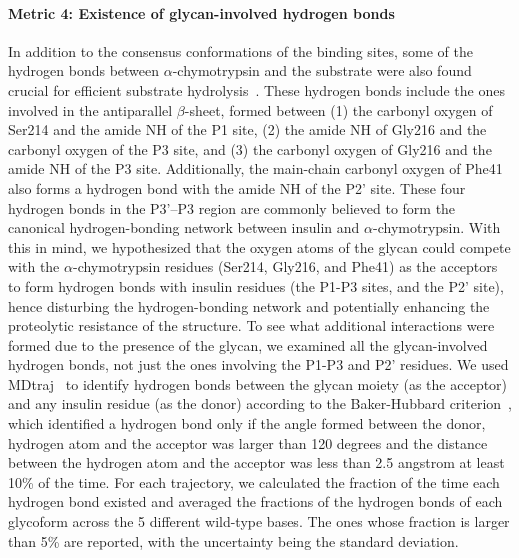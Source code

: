 \documentclass[9pt]{elife}
\begin{document}
\paragraph{Metric 4: Existence of glycan-involved hydrogen bonds}
In addition to the consensus conformations of the binding sites, some of the hydrogen bonds between $\alpha$-chymotrypsin and the substrate were also found crucial for efficient substrate hydrolysis~\cite{hedstrom2002serine}. These hydrogen bonds include the ones involved in the antiparallel $\beta$-sheet, formed between (1) the carbonyl oxygen of Ser214 and the amide NH of the P1 site, (2) the amide NH of Gly216 and the carbonyl oxygen of the P3 site, and (3) the carbonyl oxygen of Gly216 and the amide  NH of the P3 site. Additionally, the main-chain carbonyl oxygen of Phe41 also forms a hydrogen bond with the amide NH of the P2' site. These four hydrogen bonds in the P3'--P3 region are commonly believed to form the canonical hydrogen-bonding network between insulin and $\alpha$-chymotrypsin. With this in mind, we hypothesized that the oxygen atoms of the glycan could compete with the $\alpha$-chymotrypsin residues (Ser214, Gly216, and Phe41) as the acceptors to form hydrogen bonds with insulin residues (the P1-P3 sites, and the P2' site), hence disturbing the hydrogen-bonding network and potentially enhancing the proteolytic resistance of the structure. To see what additional interactions were formed due to the presence of the glycan, we examined all the glycan-involved hydrogen bonds, not just the ones involving the P1-P3 and P2' residues. We used MDtraj~\cite{mcgibbon2015mdtraj} to identify hydrogen bonds between the glycan moiety (as the acceptor) and any insulin residue (as the donor) according to the Baker-Hubbard criterion~\cite{baker1984hydrogen}, which identified a hydrogen bond only if the angle formed between the donor, hydrogen atom and the acceptor was larger than 120 degrees and the distance between the hydrogen atom and the acceptor was less than 2.5 angstrom at least 10\% of the time. For each trajectory, we calculated the fraction of the time each hydrogen bond existed and averaged the fractions of the hydrogen bonds of each glycoform across the 5 different wild-type bases. The ones whose fraction is larger than 5\% are reported, with the uncertainty being the standard deviation.
\end{document}
